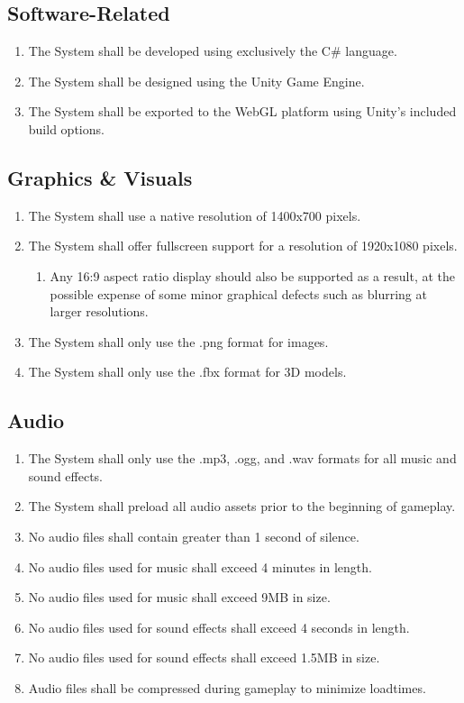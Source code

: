 \documentclass[12pt]{report}
\newenvironment{reqlist}{
	\renewcommand{\labelenumi}{\tab\thesubsection.\arabic{enumi}}
	\renewcommand{\labelenumii}{\thesubsection.\arabic{enumi}.\arabic{enumii}}
	\begin{enumerate}[itemsep = 1pt, parsep = 0pt, leftmargin = *]
}{\end{enumerate}}
\begin{document}
	\subsection{Software-Related}
		\begin{reqlist}
			\item The System shall be developed using exclusively the C\# language.
			\item The System shall be designed using the Unity Game Engine.
			\item The System shall be exported to the WebGL platform using Unity's included build options.
		\end{reqlist}
	\subsection{Graphics \& Visuals}
		\begin{reqlist}
			\item The System shall use a native resolution of 1400x700 pixels.
			\item The System shall offer fullscreen support for a resolution of 1920x1080 pixels.
			\begin{reqlist}
				\item Any 16:9 aspect ratio display should also be supported as a result, at the possible expense of some minor graphical defects such as blurring at larger resolutions.
			\end{reqlist}
			\item The System shall only use the .png format for images.
			\item The System shall only use the .fbx format for 3D models.
		\end{reqlist}
	\subsection{Audio}
		\begin{reqlist}
			\item The System shall only use the .mp3, .ogg, and .wav formats for all music and sound effects.
			\item The System shall preload all audio assets prior to the beginning of gameplay.
			\item No audio files shall contain greater than 1 second of silence.
			\item No audio files used for music shall exceed 4 minutes in length.
			\item No audio files used for music shall exceed 9MB in size.
			\item No audio files used for sound effects shall exceed 4 seconds in length.
			\item No audio files used for sound effects shall exceed 1.5MB in size.
			\item Audio files shall be compressed during gameplay to minimize loadtimes.
		\end{reqlist}
\end{document}
